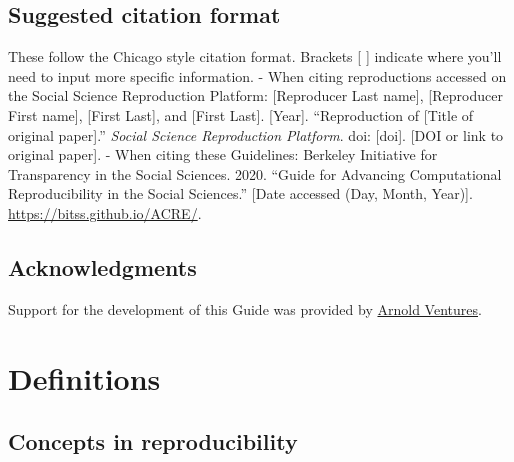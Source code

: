 \documentclass[
]{book}
\begin{document}
\hypertarget{suggested-citation-format}{%
\section{Suggested citation format}\label{suggested-citation-format}}

These follow the Chicago style citation format. Brackets {[} {]} indicate where you'll need to input more specific information.
- When citing reproductions accessed on the Social Science Reproduction Platform: {[}Reproducer Last name{]}, {[}Reproducer First name{]}, {[}First Last{]}, and {[}First Last{]}. {[}Year{]}. ``Reproduction of {[}Title of original paper{]}.'' \emph{Social Science Reproduction Platform}. doi: {[}doi{]}. {[}DOI or link to original paper{]}.
- When citing these Guidelines: Berkeley Initiative for Transparency in the Social Sciences. 2020. ``Guide for Advancing Computational Reproducibility in the Social Sciences.'' {[}Date accessed (Day, Month, Year){]}. \url{https://bitss.github.io/ACRE/}.

\hypertarget{acknowledgments}{%
\section{Acknowledgments}\label{acknowledgments}}

Support for the development of this Guide was provided by \href{https://www.arnoldventures.org/}{Arnold Ventures}.

\hypertarget{definitions}{%
\chapter{Definitions}\label{definitions}}

\hypertarget{concepts-in-reproducibility}{%
\section{Concepts in reproducibility}\label{concepts-in-reproducibility}}
\end{document}
